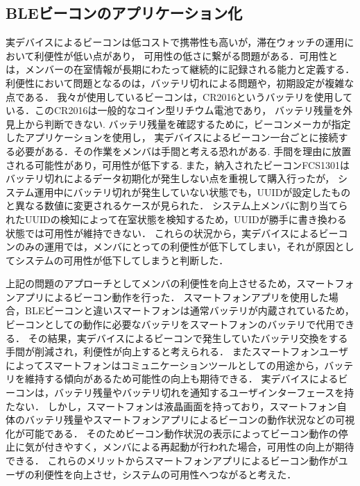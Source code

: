 


\subsection{ BLEビーコンのアプリケーション化}




実デバイスによるビーコンは低コストで携帯性も高いが，滞在ウォッチの運用において利便性が低い点があり，
可用性の低さに繋がる問題がある．可用性とは，メンバーの在室情報が長期にわたって継続的に記録される能力と定義する．
利便性において問題となるのは，バッテリ切れによる問題や，初期設定が複雑な点である．
我々が使用しているビーコンは，CR2016というバッテリを使用している．このCR2016は一般的なコイン型リチウム電池であり，
バッテリ残量を外見上から判断できない.
バッテリ残量を確認するために，ビーコンメーカが指定したアプリケーションを使用し，
実デバイスによるビーコン一台ごとに接続する必要がある．その作業をメンバは手間と考える恐れがある.
手間を理由に放置される可能性があり，可用性が低下する.
また，納入されたビーコンFCS1301はバッテリ切れによるデータ初期化が発生しない点を重視して購入行ったが，
システム運用中にバッテリ切れが発生していない状態でも，UUIDが設定したものと異なる数値に変更されるケースが見られた．
システム上メンバに割り当てられたUUIDの検知によって在室状態を検知するため，UUIDが勝手に書き換わる状態では可用性が維持できない．
これらの状況から，実デバイスによるビーコンのみの運用では，メンバにとっての利便性が低下してしまい，それが原因としてシステムの可用性が低下してしまうと判断した．


上記の問題のアプローチとしてメンバの利便性を向上させるため，スマートフォンアプリによるビーコン動作を行った．
スマートフォンアプリを使用した場合，BLEビーコンと違いスマートフォンは通常バッテリが内蔵されているため，ビーコンとしての動作に必要なバッテリをスマートフォンのバッテリで代用できる．
その結果，実デバイスによるビーコンで発生していたバッテリ交換をする手間が削減され，利便性が向上すると考えられる．
またスマートフォンユーザによってスマートフォンはコミュニケーションツールとしての用途から，バッテリを維持する傾向があるため可能性の向上も期待できる．
実デバイスによるビーコンは，バッテリ残量やバッテリ切れを通知するユーザインターフェースを持たない．
しかし，スマートフォンは液晶画面を持っており，スマートフォン自体のバッテリ残量やスマートフォンアプリによるビーコンの動作状況などの可視化が可能である．
そのためビーコン動作状況の表示によってビーコン動作の停止に気が付きやすく，メンバによる再起動が行われた場合，可用性の向上が期待できる．
これらのメリットからスマートフォンアプリによるビーコン動作がユーザの利便性を向上させ，システムの可用性へつながると考えた．


